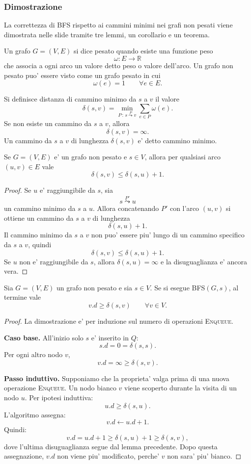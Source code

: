 \subsubsection{Dimostrazione}
La correttezza di BFS rispetto ai cammini minimi nei grafi non pesati viene dimostrata nelle slide tramite tre lemmi, un corollario e un teorema.

\begin{definizione}
Un grafo $G=(V,E)$ si dice pesato quando esiste una funzione peso
\[
\omega:E\to\mathbb{R}
\]
che associa a ogni arco un valore detto peso o valore dell'arco. Un grafo non pesato puo' essere visto come un grafo pesato in cui
\[
\omega(e)=1\qquad \forall e\in E.
\]
\end{definizione}

\begin{definizione}
Si definisce distanza di cammino minimo da $s$ a $v$ il valore
\[
\delta(s,v)=
\min_{P\,:\,s\overset{P}{\leadsto} v}
\sum_{e\in P}\omega(e).
\]
Se non esiste un cammino da $s$ a $v$, allora
\[
\delta(s,v)=\infty.
\]
Un cammino da $s$ a $v$ di lunghezza $\delta(s,v)$ e' detto cammino minimo.
\end{definizione}

\begin{lemma}
Se $G=(V,E)$ e' un grafo non pesato e $s\in V$, allora per qualsiasi arco $(u,v)\in E$ vale
\[
\delta(s,v)\le \delta(s,u)+1.
\]
\end{lemma}

\begin{proof}
Se $u$ e' raggiungibile da $s$, sia
\[
s\overset{P'}{\leadsto} u
\]
un cammino minimo da $s$ a $u$. Allora concatenando $P'$ con l'arco $(u,v)$ si ottiene un cammino da $s$ a $v$ di lunghezza
\[
\delta(s,u)+1.
\]
Il cammino minimo da $s$ a $v$ non puo' essere piu' lungo di un cammino specifico da $s$ a $v$, quindi
\[
\delta(s,v)\le \delta(s,u)+1.
\]
Se $u$ non e' raggiungibile da $s$, allora $\delta(s,u)=\infty$ e la disuguaglianza e' ancora vera.
\end{proof}

\begin{lemma}
Sia $G=(V,E)$ un grafo non pesato e sia $s\in V$. Se si esegue \textsc{BFS}$(G,s)$, al termine vale
\[
v.d\ge \delta(s,v)\qquad\forall v\in V.
\]
\end{lemma}

\begin{proof}
La dimostrazione e' per induzione sul numero di operazioni \textsc{Enqueue}.

\textbf{Caso base.}
All'inizio solo $s$ e' inserito in $Q$:
\[
s.d=0=\delta(s,s).
\]
Per ogni altro nodo $v$,
\[
v.d=\infty\ge \delta(s,v).
\]

\textbf{Passo induttivo.}
Supponiamo che la proprieta' valga prima di una nuova operazione \textsc{Enqueue}. Un nodo bianco $v$ viene scoperto durante la visita di un nodo $u$. Per ipotesi induttiva:
\[
u.d\ge \delta(s,u).
\]
L'algoritmo assegna:
\[
v.d\gets u.d+1.
\]
Quindi:
\[
v.d=u.d+1\ge \delta(s,u)+1\ge \delta(s,v),
\]
dove l'ultima disuguaglianza segue dal lemma precedente. Dopo questa assegnazione, $v.d$ non viene piu' modificato, perche' $v$ non sara' piu' bianco.
\end{proof}

